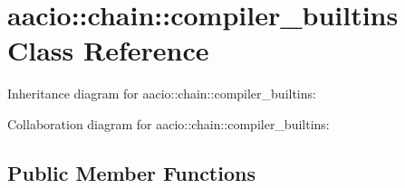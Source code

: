 \hypertarget{classaacio_1_1chain_1_1compiler__builtins}{}\section{aacio\+:\+:chain\+:\+:compiler\+\_\+builtins Class Reference}
\label{classaacio_1_1chain_1_1compiler__builtins}


Inheritance diagram for aacio\+:\+:chain\+:\+:compiler\+\_\+builtins\+:


Collaboration diagram for aacio\+:\+:chain\+:\+:compiler\+\_\+builtins\+:
\subsection*{Public Member Functions}
